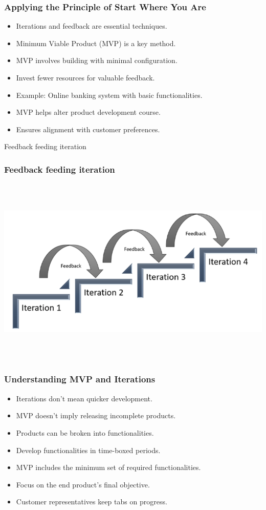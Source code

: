 \documentclass[aspectratio=169, table]{beamer}
\begin{document}
\begin{frame}
	\frametitle{Applying the Principle of Start Where You Are}
\begin{itemize}
	\item Iterations and feedback are essential techniques.
	\item Minimum Viable Product (MVP) is a key method.
	\item MVP involves building with minimal configuration.
	\item Invest fewer resources for valuable feedback.
	\item Example: Online banking system with basic functionalities.
	\item MVP helps alter product development course.
	\item Ensures alignment with customer preferences.
\end{itemize}
\end{frame}

\begin{frame}{Feedback feeding iteration} 	 \frametitle{ Feedback feeding iteration} \begin{center} 	\includegraphics[width=0.8\linewidth]{images/image-02.png} \end{center} \end{frame}

\begin{frame}
\frametitle{Understanding MVP and Iterations}

\begin{itemize}
	\item Iterations don't mean quicker development.
	\item MVP doesn't imply releasing incomplete products.
	\item Products can be broken into functionalities.
	\item Develop functionalities in time-boxed periods.
	\item MVP includes the minimum set of required functionalities.
	\item Focus on the end product's final objective.
	\item Customer representatives keep tabs on progress.
\end{itemize}
\end{frame}
\end{document}
